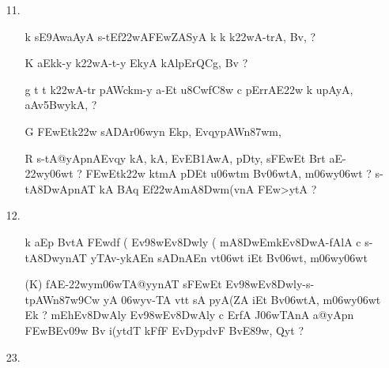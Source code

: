 \def\DevnagVersion{2.15}\documentclass{article}
\begin{document}
\begin{itemize}
\item[11.] \begin{itemize}

           \item[{\dn k}] {\dn {}s\2E\39AwaAyA\2 s\2-tEf\322wA\3FEwZASyA\2 k\? k\? k\322wA-trA, Bv\?, {\rs ?\re}}
           
           \item[{\dn K}] {\dn aEkk-y k\322wA-t-y\0 EkyA kAlpErQC\?g, Bv\? {\rs ?\re}}
            
           \item[{\dn g}] {\dn t\? t\? k\322wA-tr\? pAWckm-y a-Et u\38Cw\?f\4\3C8w\2 c pErrAE\322w\2 k\? upAyA, aAv\35BwykA, {\rs ?\re}}
           
           \item[{\dn G}] {\dn \3FEwEtk\322w\2 sADAr\306wy\?n Ekp\0, EvqypAWn\387wm,} 
           
           \item[{\dn R}] {\dn s\2-tA@yApnAEvqy\? kA, kA, EvEB\31AwA, pDty, s\2\3FEwEt Brt\? aE-\322wy\306wt\? {\rs ?\re} \3FEwEtk\322w\2 ktmA\2 pDEt u\306wtm\2 Bv\306wtA, m\306wy\306wt\? {\rs ?\re} s\2-tA\38DwApnAT{\rdt} kA BAq Ef\322wAmA\38Dwm(v\?nA \3FEw>ytA {\rs ?\re}}
           \end{itemize}

\item[{12.}]\begin{itemize}
                \item[{\dn k}] {\dn aEp BvtA\2 \3FEwd\?f\? {\rs (\re} Ev\398wEv\38Dwly\? {\rs (\re} mA\38DwEmkEv\38DwA{\rs -\re}fAlA c s\2-tA\38DwynAT\? yTAv-ykAEn sADnAEn vt\0\306wt\? iEt Bv\306wt, m\306wy\306wt}
                
                \item[({\dn K})] {\dn fAE-\322wym\306wTA@yynAT{\rdt} s\2\3FEwEt Ev\398wEv\38Dwly{\rs -\re}s\2-tpAWn\387w\39Cw\? yA \306wyv-TA vt\0t\?{\rs ,\re} sA pyA\0(ZA iEt Bv\306wtA, m\306wy\306wt\? Ek {\rs ?\re} mEhEv\38DwAly\? Ev\398wEv\38DwAly\? c ErfA\2 J\306wTAnA a@yApn\2 \3FEwBEv\309w Bv\? i(y\?tdT\4 kFfF EvD\?ypdvF BvE\389w, Qy\?t {\rs ?\re}}

               \end{itemize}

\item[23.] \begin{itemize}
            

\end{itemize}
\end{itemize}
\end{document}
